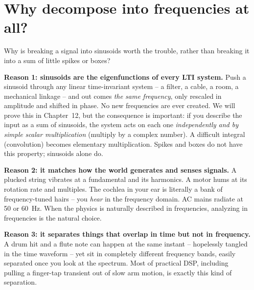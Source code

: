 \section{Why decompose into frequencies at all?}

Why is breaking a signal into sinusoids worth
the trouble, rather than breaking it into a sum of little spikes or boxes?

\begin{whybox}
\textbf{Reason 1: sinusoids are the eigenfunctions of every LTI system.} Push a
sinusoid through any linear time-invariant system -- a filter, a cable, a room, a
mechanical linkage -- and out comes \emph{the same frequency}, only rescaled in
amplitude and shifted in phase. No new frequencies are ever created. We will prove
this in Chapter~12, but the consequence is important: if you describe the input as a
sum of sinusoids, the system acts on each one \emph{independently and by simple scalar multiplication}
(multiply by a complex number). A difficult integral (convolution) becomes
elementary multiplication. Spikes and boxes do not have this property; sinusoids
alone do.
\end{whybox}

\begin{whybox}
\textbf{Reason 2: it matches how the world generates and senses signals.} A plucked
string vibrates at a fundamental and its harmonics. A motor hums at its rotation
rate and multiples. The cochlea in your ear is literally a bank of frequency-tuned
hairs -- you \emph{hear} in the frequency domain. AC mains radiate at 50 or 60~Hz.
When the physics is naturally described in frequencies, analyzing in frequencies is
the natural choice.
\end{whybox}

\begin{whybox}
\textbf{Reason 3: it separates things that overlap in time but not in frequency.}
A drum hit and a flute note can happen at the same instant -- hopelessly tangled in
the time waveform -- yet sit in completely different frequency bands, easily separated
once you look at the spectrum. Most of practical DSP, including pulling a
finger-tap transient out of slow arm motion, is exactly this kind of separation.
\end{whybox}

